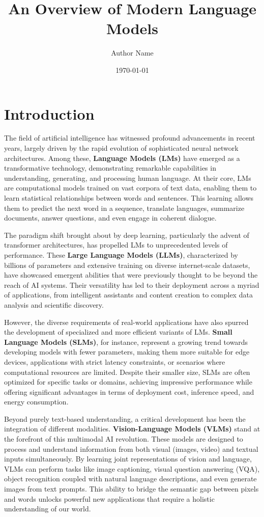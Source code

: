 \documentclass{article}
\title{An Overview of Modern Language Models}
\author{Author Name}
\date{\today}
\begin{document}
\maketitle

\section{Introduction}
The field of artificial intelligence has witnessed profound advancements in recent years, largely driven by the rapid evolution of sophisticated neural network architectures. Among these, \textbf{Language Models (LMs)} have emerged as a transformative technology, demonstrating remarkable capabilities in understanding, generating, and processing human language. At their core, LMs are computational models trained on vast corpora of text data, enabling them to learn statistical relationships between words and sentences. This learning allows them to predict the next word in a sequence, translate languages, summarize documents, answer questions, and even engage in coherent dialogue.

The paradigm shift brought about by deep learning, particularly the advent of transformer architectures, has propelled LMs to unprecedented levels of performance. These \textbf{Large Language Models (LLMs)}, characterized by billions of parameters and extensive training on diverse internet-scale datasets, have showcased emergent abilities that were previously thought to be beyond the reach of AI systems. Their versatility has led to their deployment across a myriad of applications, from intelligent assistants and content creation to complex data analysis and scientific discovery.

However, the diverse requirements of real-world applications have also spurred the development of specialized and more efficient variants of LMs. \textbf{Small Language Models (SLMs)}, for instance, represent a growing trend towards developing models with fewer parameters, making them more suitable for edge devices, applications with strict latency constraints, or scenarios where computational resources are limited. Despite their smaller size, SLMs are often optimized for specific tasks or domains, achieving impressive performance while offering significant advantages in terms of deployment cost, inference speed, and energy consumption.

Beyond purely text-based understanding, a critical development has been the integration of different modalities. \textbf{Vision-Language Models (VLMs)} stand at the forefront of this multimodal AI revolution. These models are designed to process and understand information from both visual (images, video) and textual inputs simultaneously. By learning joint representations of vision and language, VLMs can perform tasks like image captioning, visual question answering (VQA), object recognition coupled with natural language descriptions, and even generate images from text prompts. This ability to bridge the semantic gap between pixels and words unlocks powerful new applications that require a holistic understanding of our world.
\end{document}
